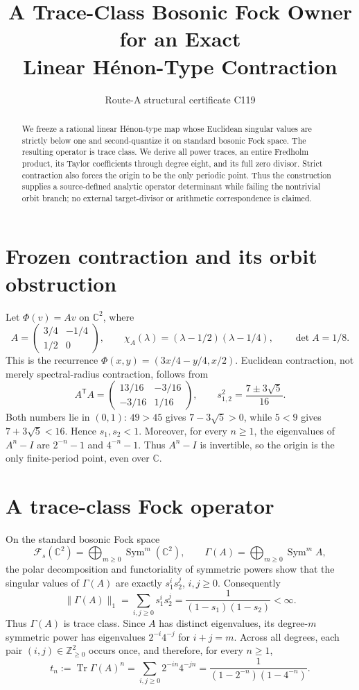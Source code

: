\documentclass[10pt]{article}
\title{A Trace-Class Bosonic Fock Owner for an Exact\\Linear H\'enon-Type Contraction}
\author{Route-A structural certificate C119}
\date{}
\begin{document}
\maketitle
\begin{abstract}
We freeze a rational linear H\'enon-type map whose Euclidean singular values
are strictly below one and second-quantize it on standard bosonic Fock space.
The resulting operator is trace class.  We derive all power traces, an entire
Fredholm product, its Taylor coefficients through degree eight, and its full
zero divisor.  Strict contraction also forces the origin to be the only
periodic point.  Thus the construction supplies a source-defined analytic
operator determinant while failing the nontrivial orbit branch; no external
target-divisor or arithmetic correspondence is claimed.
\end{abstract}

\section{Frozen contraction and its orbit obstruction}
Let $\Phi(v)=Av$ on $\mathbb C^2$, where
\[
 A=\begin{pmatrix}3/4&-1/4\\1/2&0\end{pmatrix},\qquad
 \chi_A(\lambda)=(\lambda-1/2)(\lambda-1/4),\qquad \det A=1/8.
\]
This is the recurrence $\Phi(x,y)=(3x/4-y/4,x/2)$.  Euclidean contraction,
not merely spectral-radius contraction, follows from
\[
 A^{\mathsf T}A=\begin{pmatrix}13/16&-3/16\\-3/16&1/16\end{pmatrix},
 \qquad s_{1,2}^2=\frac{7\pm3\sqrt5}{16}.
\]
Both numbers lie in $(0,1)$: $49>45$ gives $7-3\sqrt5>0$, while
$5<9$ gives $7+3\sqrt5<16$.  Hence $s_1,s_2<1$.  Moreover, for every
$n\geq1$, the eigenvalues of $A^n-I$ are $2^{-n}-1$ and $4^{-n}-1$.
Thus $A^n-I$ is invertible, so the origin is the only finite-period point,
even over $\mathbb C$.

\section{A trace-class Fock operator}
On the standard bosonic Fock space
\[
 \mathcal F_s(\mathbb C^2)=\bigoplus_{m\geq0}\operatorname{Sym}^m(\mathbb C^2),
 \qquad \Gamma(A)=\bigoplus_{m\geq0}\operatorname{Sym}^m A,
\]
the polar decomposition and functoriality of symmetric powers show that the
singular values of $\Gamma(A)$ are exactly $s_1^i s_2^j$, $i,j\geq0$.
Consequently
\[
 \|\Gamma(A)\|_1=\sum_{i,j\geq0}s_1^i s_2^j
 =\frac1{(1-s_1)(1-s_2)}<\infty.
\]
Thus $\Gamma(A)$ is trace class.  Since $A$ has distinct eigenvalues, its
degree-$m$ symmetric power has eigenvalues $2^{-i}4^{-j}$ for $i+j=m$.
Across all degrees, each pair $(i,j)\in\mathbb Z_{\geq0}^2$ occurs once, and
therefore, for every $n\geq1$,
\begin{equation}
 t_n:=\operatorname{Tr}\Gamma(A)^n
 =\sum_{i,j\geq0}2^{-in}4^{-jn}
 =\frac1{(1-2^{-n})(1-4^{-n})}. \tag{1}
\end{equation}
\end{document}
